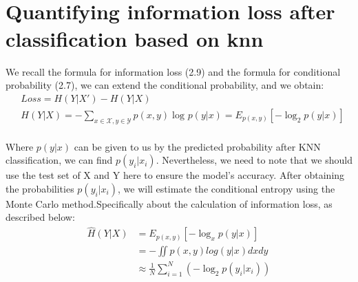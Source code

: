     \\ \hspace*{\fill} \\
   
    \section{Quantifying information loss after classification based on knn}
    We recall the formula for information loss (2.9) and the formula for conditional probability (2.7), we can extend the conditional probability, and we obtain:
    \begin{equation}\nonumber
    \begin{aligned}
    &Loss =H(Y|X') - H(Y|X) \\
    &H(Y|X) = -\sum_{x\in \mathcal{X},y\in \mathcal{Y}}p(x,y)\log_{}{p(y|x)} = E_{p(x,y)}\left [ -\log_{2}{p(y|x)}  \right ]   \\
    
    \end{aligned}
    \end{equation}
    
Where $p(y|x)$ can be given to us by the predicted probability after KNN classification, we can find $p(y_{i} |x_{i}) $. Nevertheless, we need to note that we should use the test set of X and Y here to ensure the model's accuracy. After obtaining the probabilities $p(y_{i} |x_{i}) $, we will estimate the conditional entropy using the Monte Carlo method.Specifically about the calculation of information loss, as described below: \cite{luengo2020survey}
\begin{equation}
\begin{aligned}
\hat{H} (Y|X) &= E_{p(x,y)}\left [ -\log_{x}{p(y|x)}  \right ]  \\
& = - \iint p(x,y)log(y|x)dxdy \\
& \approx \frac{1}{N} \sum_{i=1}^{N}  (-\log_{2}{p(y_{i}|x_{i} )} )
\end{aligned}
\end{equation}